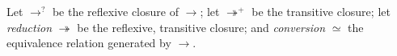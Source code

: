 \begin{definition}
\begin{code}
\>[2] \AgdaSymbol{:}  \AgdaSymbol{\{}\AgdaSymbol{\}} \AgdaSymbol{\{}\AgdaSymbol{\}} \AgdaSymbol{\{}\AgdaSymbol{\}} \AgdaSymbol{\{}\AgdaSymbol{\}} \AgdaSymbol{\{}\AgdaSymbol{\}} \AgdaSymbol{\{}\AgdaSymbol{\}} \AgdaSymbol{\{}\AgdaSymbol{\}}   \AgdaSymbol{\{}\AgdaSymbol{\}}  \AgdaSymbol{(}     \AgdaSymbol{(}  \AgdaSymbol{)}      \AgdaInductiveConstructor{[]}\AgdaSymbol{)} \AgdaSymbol{(}   \AgdaSymbol{(}  \AgdaSymbol{)}       \AgdaSymbol{)}\<%
\end{code}

Let $\rightarrow^?$ be the reflexive closure of $\rightarrow$;
let $\twoheadrightarrow^+$ be the transitive closure;
let \emph{reduction} $\twoheadrightarrow$ be the reflexive, transitive closure; and \emph{conversion} $\simeq$ the equivalence relation generated by $\rightarrow$.
\end{definition}

